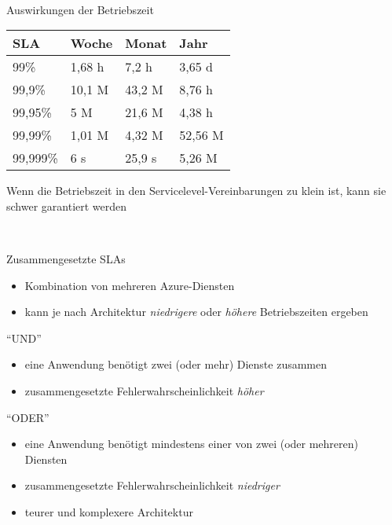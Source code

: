 \documentclass{scrartcl}
\newenvironment{flashcard}[2][]{%
    #1
    \vfill
    \centerline{\Large{#2}}
    \vfill
\newpage
}
{\newpage}
\begin{document}
    \begin{flashcard}[\ ]{Auswirkungen der Betriebszeit}
        \begin{tabular}{l|lll}
            SLA      &  Woche  & Monat  & Jahr    \\
            \hline
            99\%     &  1,68 h & 7,2 h  & 3,65 d  \\
            99,9\%   &  10,1 M & 43,2 M & 8,76 h  \\
            99,95\%  &  5 M    & 21,6 M & 4,38 h  \\
            99,99\%  &  1,01 M & 4,32 M & 52,56 M \\
            99,999\% &  6 s    & 25,9 s & 5,26 M  \\
        \end{tabular}

        \vspace{5mm}
        Wenn die Betriebszeit in den Servicelevel-Vereinbarungen zu klein ist, kann sie schwer garantiert werden
    \end{flashcard}

    \begin{flashcard}[\ ]{Zusammengesetzte SLAs}
        \begin{itemize}
            \item Kombination von mehreren Azure-Diensten
            \item kann je nach Architektur \emph{niedrigere} oder \emph{höhere} Betriebszeiten ergeben
        \end{itemize}
        ``UND''
        \begin{itemize}
            \item eine Anwendung benötigt zwei (oder mehr) Dienste zusammen
            \item zusammengesetzte Fehlerwahrscheinlichkeit \emph{höher}
        \end{itemize}
        ``ODER''
        \begin{itemize}
            \item eine Anwendung benötigt mindestens einer von zwei (oder mehreren) Diensten
            \item zusammengesetzte Fehlerwahrscheinlichkeit \emph{niedriger}
            \item teurer und komplexere Architektur
        \end{itemize}
    \end{flashcard}
\end{document}
